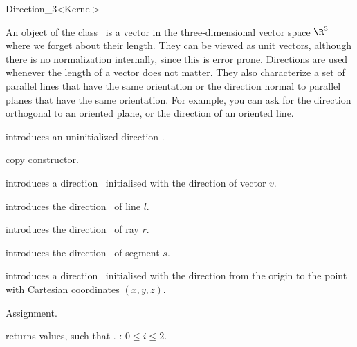 \begin{ccRefClass}{Direction_3<Kernel>}

\ccDefinition
An object of the class \ccRefName\ is a vector in the three-dimensional 
vector space $\R^3$  where we forget about their length. They can be
viewed as unit vectors, although there is no normalization internally,
since this is error prone.  Directions are used whenever the length of
a vector does not matter. 
They also characterize a set of parallel lines that have the same orientation 
or the direction normal to parallel planes that have the same orientation.
For example, you can ask for the direction
orthogonal to an oriented plane, or the direction of an oriented line.


\ccCreation
{}


\ccHidden {}
             {introduces an uninitialized direction \ccVar.}

\ccHidden {}
            {copy constructor.}

            {introduces a direction \ccVar\ initialised with the 
             direction of vector $v$.}

            {introduces the direction \ccVar\ of line $l$.}

            {introduces the direction \ccVar\ of ray $r$.}

            {introduces the direction \ccVar\ of segment $s$.}

            {introduces a direction \ccVar\ initialised with the direction 
             from the origin to the point with Cartesian coordinates $(x, y, z)$.}


\ccOperations

\ccHidden {}
        {Assignment.}

       {returns values, such that \ccVar {}.
        \ccPrecond: $0 \leq i \leq 2$.}


\end{ccRefClass}
